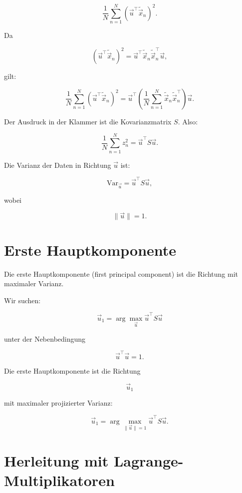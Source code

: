 \[
    \frac{1}{N}
    \sum_{n=1}^{N}
    (\vec{u}^{\top}\tilde{\vec{x}}_n)^2.
\]

Da

\[
    (\vec{u}^{\top}\tilde{\vec{x}}_n)^2
    =
    \vec{u}^{\top}
    \tilde{\vec{x}}_n
    \tilde{\vec{x}}_n^{\top}
    \vec{u},
\]

gilt:

\[
    \frac{1}{N}
    \sum_{n=1}^{N}
    (\vec{u}^{\top}\tilde{\vec{x}}_n)^2
    =
    \vec{u}^{\top}
    \left(
        \frac{1}{N}
        \sum_{n=1}^{N}
        \tilde{\vec{x}}_n
        \tilde{\vec{x}}_n^{\top}
    \right)
    \vec{u}.
\]

Der Ausdruck in der Klammer ist die Kovarianzmatrix \(S\).
Also:

\[
    \frac{1}{N}
    \sum_{n=1}^{N}
    z_n^2
    =
    \vec{u}^{\top}S\vec{u}.
\]

\begin{definitionbox}
Die Varianz der Daten in Richtung \(\vec{u}\) ist:

\[
    \mathrm{Var}_{\vec{u}}
    =
    \vec{u}^{\top}S\vec{u},
\]

wobei

\[
    \|\vec{u}\|=1.
\]
\end{definitionbox}

\section{Erste Hauptkomponente}

Die erste Hauptkomponente (first principal component) ist die Richtung mit maximaler Varianz.

Wir suchen:

\[
    \vec{u}_1
    =
    \arg\max_{\vec{u}}
    \vec{u}^{\top}S\vec{u}
\]

unter der Nebenbedingung

\[
    \vec{u}^{\top}\vec{u}=1.
\]

\begin{definitionbox}
Die erste Hauptkomponente ist die Richtung

\[
    \vec{u}_1
\]

mit maximaler projizierter Varianz:

\[
    \vec{u}_1
    =
    \arg\max_{\|\vec{u}\|=1}
    \vec{u}^{\top}S\vec{u}.
\]
\end{definitionbox}

\section{Herleitung mit Lagrange-Multiplikatoren}


